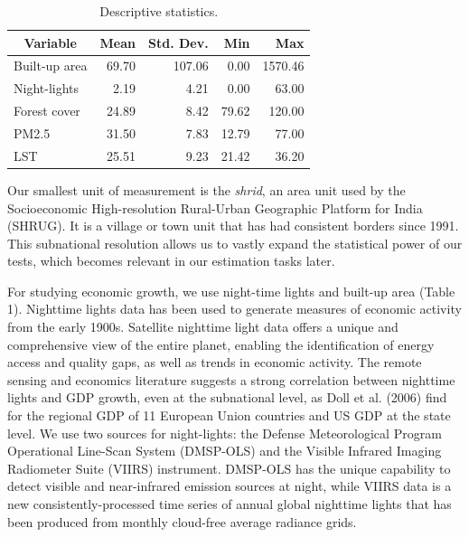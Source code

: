\documentclass[doublespace,times,Afour,review]{template/sagej}
\begin{document}
\begin{table}[b]
    \centering
    \begin{tabular}{|l|r|r|r|r|}
    \hline
    \multicolumn{1}{|c|}{\textbf{Variable}} & \multicolumn{1}{c|}{\textbf{Mean}} & \multicolumn{1}{c|}{\textbf{Std. Dev.}} & \textbf{Min} & \textbf{Max} \\ \hline
    Built-up area                           & 69.70                             & 107.06                                  & 0.00            & 1570.46      \\ \hline
    Night-lights                            & 2.19                              & 4.21                                   & 0.00            & 63.00           \\ \hline
    Forest cover                            & 24.89                              & 8.42                                    & 79.62        & 120.00          \\ \hline
    PM2.5                                   & 31.50                              & 7.83                                    & 12.79        & 77.00           \\ \hline
    LST                                     & 25.51                             & 9.23                                   & 21.42       & 36.20       \\ \hline
    \end{tabular}
    \caption{Descriptive statistics. \label{table:descstats}}
\end{table}


Our smallest unit of measurement is the \textit{shrid}, an area unit used by the Socioeconomic High-resolution Rural-Urban Geographic Platform for India (SHRUG). It is a village or town unit that has had consistent borders since 1991. This subnational resolution allows us to vastly expand the  statistical power of our tests, which becomes relevant in our estimation tasks later.

For studying economic growth, we use night-time lights and built-up area (Table 1). Nighttime lights data has been used to generate measures of economic activity from the early 1900s. Satellite nighttime light data offers a unique and comprehensive view of the entire planet, enabling the identification of energy access and quality gaps, as well as trends in economic activity. The remote sensing and economics literature suggests a strong correlation between nighttime lights and GDP growth, even at the subnational level, as Doll et al. (2006) find for the regional GDP of 11 European Union countries and US GDP at the state level. We use two sources for night-lights: the Defense Meteorological Program Operational Line-Scan System (DMSP-OLS) and the Visible Infrared Imaging Radiometer Suite (VIIRS) instrument. DMSP-OLS has the unique capability to detect visible and near-infrared emission sources at night, while VIIRS data is a new consistently-processed time series of annual global nighttime lights that has been produced from monthly cloud-free average radiance grids.
\end{document}
